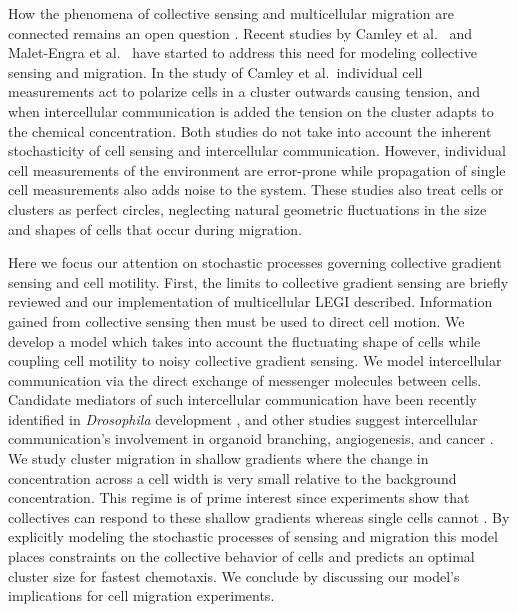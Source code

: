 How the phenomena of collective sensing and multicellular migration are connected remains an open question \cite{varennes2016sense,defranco2008migrating,haeger2015collective}. Recent studies by Camley et al.\ \cite{camley2016emergent} and Malet-Engra et al.\ \cite{malet2015collective} have started to address this need for modeling collective sensing and migration. In the study of Camley et al.\ individual cell measurements act to polarize cells in a cluster outwards causing tension, and when intercellular communication is added the tension on the cluster adapts to the chemical concentration. Both studies do not take into account the inherent stochasticity of cell sensing and intercellular communication. However, individual cell measurements of the environment are error-prone while propagation of single cell measurements also adds noise to the system. These studies also treat cells or clusters as perfect circles, neglecting natural geometric fluctuations in the size and shapes of cells that occur during migration.

Here we focus our attention on stochastic processes governing collective gradient sensing and cell motility. First, the limits to collective gradient sensing are briefly reviewed and our implementation of multicellular LEGI described. Information gained from collective sensing then must be used to direct cell motion. We develop a model which takes into account the fluctuating shape of cells while coupling cell motility to noisy collective gradient sensing. We model intercellular communication via the direct exchange of messenger molecules between cells. Candidate mediators of such intercellular communication have been recently identified in \textit{Drosophila} development \cite{ramel2013rab11}, and other studies suggest intercellular communication's involvement in organoid branching, angiogenesis, and cancer \cite{ellison2016cell,gerhardt2003vegf,hsu2000cadherin,friedl2009collective}. We study cluster migration in shallow gradients where the change in concentration across a cell width is very small relative to the background concentration. This regime is of prime interest since experiments show that collectives can respond to these shallow gradients whereas single cells cannot \cite{ellison2016cell,malet2015collective,rosoff2004new}. By explicitly modeling the stochastic processes of sensing and migration this model places constraints on the collective behavior of cells and predicts an optimal cluster size for fastest chemotaxis. We conclude by discussing our model's implications for cell migration experiments.


